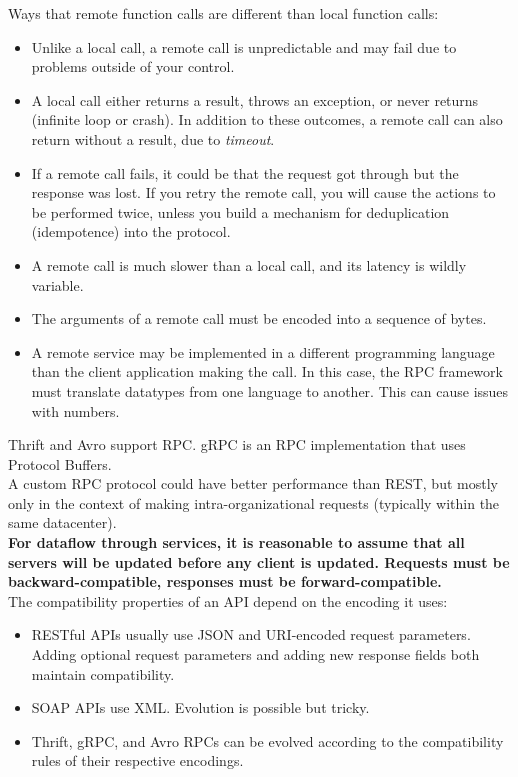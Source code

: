 \documentclass[12pt, titlepage]{article}
\begin{document}
Ways that remote function calls are different than local function calls:
\begin{itemize}
    \item Unlike a local call, a remote call is unpredictable and may fail due to problems outside of your control.
    \item A local call either returns a result, throws an exception, or never returns (infinite loop or crash). In addition to these outcomes, a remote call can also return without a result, due to \textit{timeout}.
    \item If a remote call fails, it could be that the request got through but the response was lost. If you retry the remote call, you will cause the actions to be performed twice, unless you build a mechanism for deduplication (idempotence) into the protocol.
    \item A remote call is much slower than a local call, and its latency is wildly variable.
    \item The arguments of a remote call must be encoded into a sequence of bytes.
    \item A remote service may be implemented in a different programming language than the client application making the call. In this case, the RPC framework must translate datatypes from one language to another. This can cause issues with numbers.
\end{itemize}

Thrift and Avro support RPC. gRPC is an RPC implementation that uses Protocol Buffers. \\

A custom RPC protocol could have better performance than REST, but mostly only in the context of making intra-organizational requests (typically within the same datacenter). \\

\textbf{For dataflow through services, it is reasonable to assume that all servers will be updated before any client is updated. Requests must be backward-compatible, responses must be forward-compatible.} \\

The compatibility properties of an API depend on the encoding it uses:
\begin{itemize}
    \item RESTful APIs usually use JSON and URI-encoded request parameters. Adding optional request parameters and adding new response fields both maintain compatibility.
    \item SOAP APIs use XML. Evolution is possible but tricky.
    \item Thrift, gRPC, and Avro RPCs can be evolved according to the compatibility rules of their respective encodings.
\end{itemize}
\end{document}

